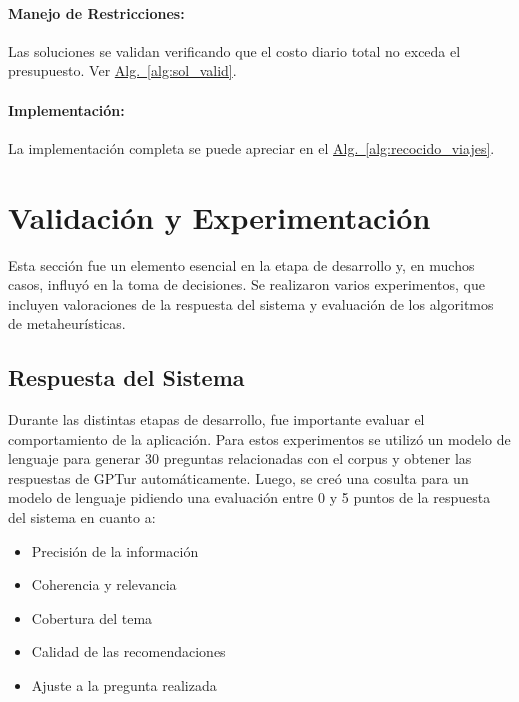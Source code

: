 \documentclass[10pt]{llncs}
\newcommand{\AlgRef}[1]{\hyperref[#1]{Alg.~\ref{#1}}}
\begin{document}
\paragraph{Manejo de Restricciones:}
Las soluciones se validan verificando que el costo diario total no exceda el presupuesto. Ver \AlgRef{alg:sol_valid}.

\paragraph{Implementación:}
La implementación completa se puede apreciar en el \AlgRef{alg:recocido_viajes}.


\vspace{\baselineskip}
\section{Validación y Experimentación}


\vspace{\baselineskip}



Esta sección fue un elemento esencial en la etapa de desarrollo y, en muchos casos, influyó en la toma de decisiones. Se realizaron varios experimentos, que incluyen valoraciones de la respuesta del sistema y evaluación de los algoritmos de metaheurísticas.

\vspace{\baselineskip}
\subsection{Respuesta del Sistema}

Durante las distintas etapas de desarrollo, fue importante evaluar el comportamiento de la aplicación. Para estos experimentos se utilizó un modelo de lenguaje para generar 30 preguntas relacionadas con el corpus y obtener las respuestas de GPTur automáticamente. Luego, 
se creó una cosulta para un modelo de lenguaje pidiendo una evaluación entre 0 y 5 puntos de la respuesta del sistema en cuanto a:
\begin{itemize}
    \item  Precisión de la información
    \item Coherencia y relevancia
    \item Cobertura del tema
    \item Calidad de las recomendaciones
    \item Ajuste a la pregunta realizada
\end{itemize}
\end{document}
